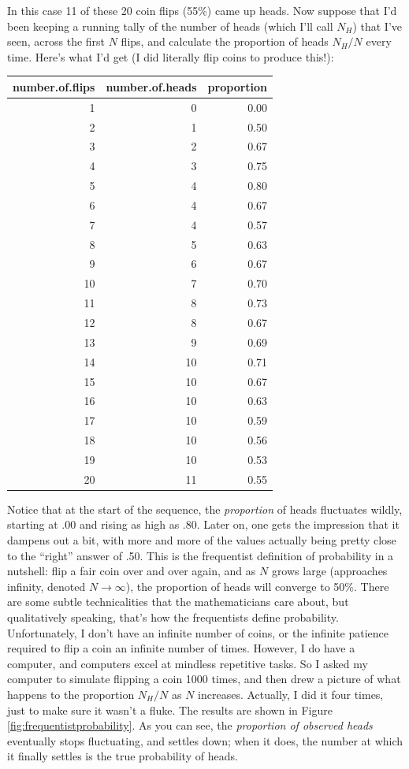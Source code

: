 \documentclass[
]{book}
\begin{document}
In this case 11 of these 20 coin flips (55\%) came up heads. Now suppose that I'd been keeping a running tally of the number of heads (which I'll call \(N_H\)) that I've seen, across the first \(N\) flips, and calculate the proportion of heads \(N_H / N\) every time. Here's what I'd get (I did literally flip coins to produce this!):

\begin{tabular}{r|r|r}
\hline
number.of.flips & number.of.heads & proportion\\
\hline
1 & 0 & 0.00\\
\hline
2 & 1 & 0.50\\
\hline
3 & 2 & 0.67\\
\hline
4 & 3 & 0.75\\
\hline
5 & 4 & 0.80\\
\hline
6 & 4 & 0.67\\
\hline
7 & 4 & 0.57\\
\hline
8 & 5 & 0.63\\
\hline
9 & 6 & 0.67\\
\hline
10 & 7 & 0.70\\
\hline
11 & 8 & 0.73\\
\hline
12 & 8 & 0.67\\
\hline
13 & 9 & 0.69\\
\hline
14 & 10 & 0.71\\
\hline
15 & 10 & 0.67\\
\hline
16 & 10 & 0.63\\
\hline
17 & 10 & 0.59\\
\hline
18 & 10 & 0.56\\
\hline
19 & 10 & 0.53\\
\hline
20 & 11 & 0.55\\
\hline
\end{tabular}

Notice that at the start of the sequence, the \emph{proportion} of heads fluctuates wildly, starting at .00 and rising as high as .80. Later on, one gets the impression that it dampens out a bit, with more and more of the values actually being pretty close to the ``right'' answer of .50. This is the frequentist definition of probability in a nutshell: flip a fair coin over and over again, and as \(N\) grows large (approaches infinity, denoted \(N\rightarrow \infty\)), the proportion of heads will converge to 50\%. There are some subtle technicalities that the mathematicians care about, but qualitatively speaking, that's how the frequentists define probability. Unfortunately, I don't have an infinite number of coins, or the infinite patience required to flip a coin an infinite number of times. However, I do have a computer, and computers excel at mindless repetitive tasks. So I asked my computer to simulate flipping a coin 1000 times, and then drew a picture of what happens to the proportion \(N_H / N\) as \(N\) increases. Actually, I did it four times, just to make sure it wasn't a fluke. The results are shown in Figure \ref{fig:frequentistprobability}. As you can see, the \emph{proportion of observed heads} eventually stops fluctuating, and settles down; when it does, the number at which it finally settles is the true probability of heads.
\end{document}
